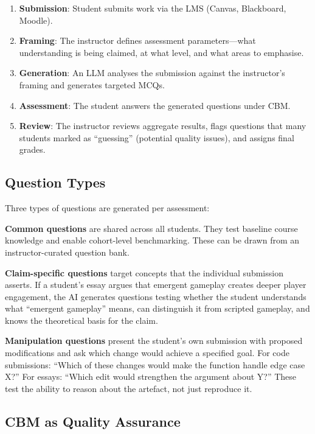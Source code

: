 \documentclass[sigconf]{acmart}
\begin{document}
\begin{enumerate}
    \item \textbf{Submission}: Student submits work via the LMS (Canvas, Blackboard, Moodle).
    \item \textbf{Framing}: The instructor defines assessment parameters---what understanding is being claimed, at what level, and what areas to emphasise.
    \item \textbf{Generation}: An LLM analyses the submission against the instructor's framing and generates targeted MCQs.
    \item \textbf{Assessment}: The student answers the generated questions under CBM.
    \item \textbf{Review}: The instructor reviews aggregate results, flags questions that many students marked as ``guessing'' (potential quality issues), and assigns final grades.
\end{enumerate}

\subsection{Question Types}

Three types of questions are generated per assessment:

\textbf{Common questions} are shared across all students. They test baseline course knowledge and enable cohort-level benchmarking. These can be drawn from an instructor-curated question bank.

\textbf{Claim-specific questions} target concepts that the individual submission asserts. If a student's essay argues that emergent gameplay creates deeper player engagement, the AI generates questions testing whether the student understands what ``emergent gameplay'' means, can distinguish it from scripted gameplay, and knows the theoretical basis for the claim.

\textbf{Manipulation questions} present the student's own submission with proposed modifications and ask which change would achieve a specified goal. For code submissions: ``Which of these changes would make the function handle edge case X?'' For essays: ``Which edit would strengthen the argument about Y?'' These test the ability to reason about the artefact, not just reproduce it.

\subsection{CBM as Quality Assurance}
\end{document}
